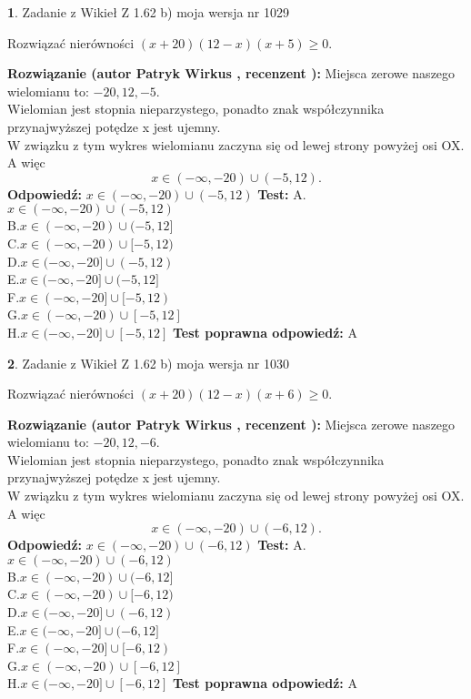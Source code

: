 \documentclass[12pt, a4paper]{article}
\theoremstyle{definition} %
\newtheorem{zad}{}
\newcommand{\zadStart}[1]{\begin{zad}#1\newline}
\newcommand{\zadStop}{\end{zad}}
\newcommand{\rozwStart}[2]{\noindent \textbf{Rozwiązanie (autor #1 , recenzent #2): }\newline}
\newcommand{\rozwStop}{\newline}
\newcommand{\odpStart}{\noindent \textbf{Odpowiedź:}\newline}
\newcommand{\odpStop}{\newline}
\newcommand{\testStart}{\noindent \textbf{Test:}\newline}
\newcommand{\testStop}{\newline}
\newcommand{\kluczStart}{\noindent \textbf{Test poprawna odpowiedź:}\newline}
\newcommand{\kluczStop}{\newline}
\begin{document}
\zadStart{Zadanie z Wikieł Z 1.62 b) moja wersja nr 1029}

Rozwiązać nierówności $(x+20)(12-x)(x+5)\ge0$.
\zadStop
\rozwStart{Patryk Wirkus}{}
Miejsca zerowe naszego wielomianu to: $-20, 12, -5$.\\
Wielomian jest stopnia nieparzystego, ponadto znak współczynnika przy\linebreak najwyższej potędze x jest ujemny.\\ W związku z tym wykres wielomianu zaczyna się od lewej strony powyżej osi OX. A więc $$x \in (-\infty,-20) \cup (-5,12).$$
\rozwStop
\odpStart
$x \in (-\infty,-20) \cup (-5,12)$
\odpStop
\testStart
A.$x \in (-\infty,-20) \cup (-5,12)$\\
B.$x \in (-\infty,-20) \cup (-5,12]$\\
C.$x \in (-\infty,-20) \cup [-5,12)$\\
D.$x \in (-\infty,-20] \cup (-5,12)$\\
E.$x \in (-\infty,-20] \cup (-5,12]$\\
F.$x \in (-\infty,-20] \cup [-5,12)$\\
G.$x \in (-\infty,-20) \cup [-5,12]$\\
H.$x \in (-\infty,-20] \cup [-5,12]$
\testStop
\kluczStart
A
\kluczStop



\zadStart{Zadanie z Wikieł Z 1.62 b) moja wersja nr 1030}

Rozwiązać nierówności $(x+20)(12-x)(x+6)\ge0$.
\zadStop
\rozwStart{Patryk Wirkus}{}
Miejsca zerowe naszego wielomianu to: $-20, 12, -6$.\\
Wielomian jest stopnia nieparzystego, ponadto znak współczynnika przy\linebreak najwyższej potędze x jest ujemny.\\ W związku z tym wykres wielomianu zaczyna się od lewej strony powyżej osi OX. A więc $$x \in (-\infty,-20) \cup (-6,12).$$
\rozwStop
\odpStart
$x \in (-\infty,-20) \cup (-6,12)$
\odpStop
\testStart
A.$x \in (-\infty,-20) \cup (-6,12)$\\
B.$x \in (-\infty,-20) \cup (-6,12]$\\
C.$x \in (-\infty,-20) \cup [-6,12)$\\
D.$x \in (-\infty,-20] \cup (-6,12)$\\
E.$x \in (-\infty,-20] \cup (-6,12]$\\
F.$x \in (-\infty,-20] \cup [-6,12)$\\
G.$x \in (-\infty,-20) \cup [-6,12]$\\
H.$x \in (-\infty,-20] \cup [-6,12]$
\testStop
\kluczStart
A
\kluczStop
\end{document}
